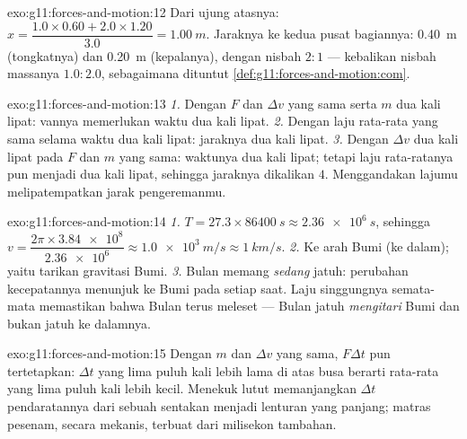 \begin{solution}{exo:g11:forces-and-motion:12}
Dari ujung atasnya: $x = \dfrac{1.0 \times 0.60 + 2.0 \times 1.20}{3.0}
= \qty{1.00}{m}$. Jaraknya ke kedua pusat bagiannya: \qty{0.40}{m}
(tongkatnya) dan \qty{0.20}{m} (kepalanya), dengan nisbah $2 : 1$ ---
kebalikan nisbah massanya $1.0 : 2.0$, sebagaimana dituntut
\cref{def:g11:forces-and-motion:com}.
\end{solution}

\begin{solution}{exo:g11:forces-and-motion:13}
\emph{1.} Dengan $F$ dan $\Delta v$ yang sama serta $m$ dua kali lipat:
vannya memerlukan waktu dua kali lipat. \emph{2.} Dengan laju rata-rata
yang sama selama waktu dua kali lipat: jaraknya dua kali lipat.
\emph{3.} Dengan $\Delta v$ dua kali lipat pada $F$ dan $m$ yang sama:
waktunya dua kali lipat; tetapi laju rata-ratanya pun menjadi dua kali
lipat, sehingga jaraknya dikalikan $4$. Menggandakan lajumu
melipatempatkan jarak pengeremanmu.
\end{solution}

\begin{solution}{exo:g11:forces-and-motion:14}
\emph{1.} $T = 27.3 \times \qty{86400}{s} \approx \qty{2.36e6}{s}$,
sehingga $v = \dfrac{2\pi \times \num{3.84e8}}{\num{2.36e6}} \approx
\qty{1.0e3}{m/s} \approx \qty{1}{km/s}$. \emph{2.} Ke arah Bumi (ke
dalam); yaitu tarikan gravitasi Bumi. \emph{3.} Bulan memang
\emph{sedang} jatuh: perubahan kecepatannya menunjuk ke Bumi pada setiap
saat. Laju singgungnya semata-mata memastikan bahwa Bulan terus meleset
--- Bulan jatuh \emph{mengitari} Bumi dan bukan jatuh ke dalamnya.
\end{solution}

\begin{solution}{exo:g11:forces-and-motion:15}
Dengan $m$ dan $\Delta v$ yang sama, $F\Delta t$ pun tertetapkan:
$\Delta t$ yang lima puluh kali lebih lama di atas busa berarti 
rata-rata yang lima puluh kali lebih kecil. Menekuk lutut memanjangkan
$\Delta t$ pendaratannya dari sebuah sentakan menjadi lenturan yang
panjang; matras pesenam, secara mekanis, terbuat dari milisekon
tambahan.
\end{solution}

